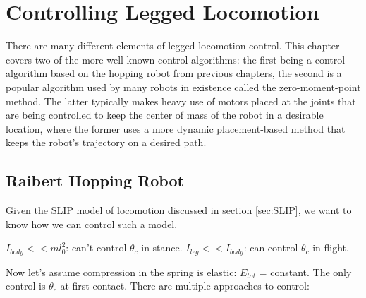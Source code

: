 \chapter{Controlling Legged Locomotion}
\label{sec:ControllingLeggedLocomotion}

There are many different elements of legged locomotion control. This chapter covers two of the more well-known control algorithms: the first being a control algorithm based on the hopping robot from previous chapters, the second is a popular algorithm used by many robots in existence called the zero-moment-point method. The latter typically makes heavy use of motors placed at the joints that are being controlled to keep the center of mass of the robot in a desirable location, where the former uses a more dynamic placement-based method that keeps the robot's trajectory on a desired path.

%
%

\section{Raibert Hopping Robot} %
\label{sec:RaibertHoppingRobot}

Given the SLIP model of locomotion discussed in section \ref{sec:SLIP}, we want to know how we can control such a model. 

$I_{body}<<ml_{0}^{2}$: can't control $\theta_{c}$ in stance.
$I_{leg}<<I_{body}$: can control $\theta_{c}$ in flight.

Now let's assume compression in the spring is elastic: $E_{tot}$ = constant. The only control is $\theta_{c}$ at first contact. There are multiple approaches to control:

